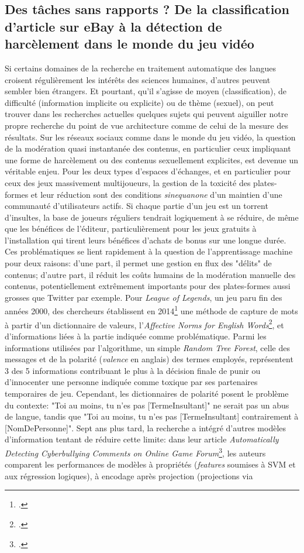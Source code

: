 \subsection{Des tâches sans rapports ? De la classification d'article sur eBay à la détection de harcèlement dans le monde du jeu vidéo}

Si certains domaines de la recherche en traitement automatique des langues croisent régulièrement les intérêts des sciences humaines, d'autres peuvent sembler bien étrangers. Et pourtant, qu'il s'agisse de moyen (classification), de difficulté (information implicite ou explicite) ou de thème (sexuel), on peut trouver dans les recherches actuelles quelques sujets qui peuvent aiguiller notre propre recherche du point de vue architecture comme de celui de la mesure des résultats. Sur les réseaux sociaux comme dans le monde du jeu vidéo, la question de la modération quasi instantanée des contenus, en particulier ceux impliquant une forme de harcèlement ou des contenus sexuellement explicites, est devenue un véritable enjeu. Pour les deux types d'espaces d'échanges, et en particulier pour ceux des jeux massivement multijoueurs, la gestion de la toxicité des plates-formes et leur réduction sont des conditions \textit{sinequanone} d'un maintien d'une communauté d'utilisateurs actifs. Si chaque partie d'un jeu est un torrent d'insultes, la base de joueurs réguliers tendrait logiquement à se réduire, de même que les bénéfices de l'éditeur, particulièrement pour les jeux gratuits à l'installation qui tirent leurs bénéfices d'achats de bonus sur une longue durée. Ces problématiques se lient rapidement à la question de l'apprentissage machine pour deux raisons: d'une part, il permet une gestion en flux des "délits" de contenus; d'autre part, il réduit les coûts humains de la modération manuelle des contenus, potentiellement extrêmement importants pour des plates-formes aussi grosses que Twitter par exemple. Pour \textit{League of Legends}, un jeu paru fin des années 2000, des chercheurs établissent en 2014\footcite{blackburn_stfu_2014} une méthode de capture de mots à partir d'un dictionnaire de valeurs, l'\textit{Affective Norms for English Words}\footcite{bradley_affective_1999}, et d'informations liées à la partie indiquée comme problématique. Parmi les informations utilisées par l'algorithme, un simple \textit{Random Tree Forest}, celle des messages et de la polarité (\textit{valence} en anglais) des termes employés, représentent 3 des 5 informations contribuant le plus à la décision finale de punir ou d'innocenter une personne indiquée comme toxique par ses partenaires temporaires de jeu. Cependant, les dictionnaires de polarité posent le problème du contexte: "Toi au moins, tu n'es pas [TermeInsultant]" ne serait pas un abus de langue, tandis que "Toi au moins, tu n'es pas [TermeInsultant] contrairement à [NomDePersonne]". Sept ans plus tard, la recherche a intégré d'autres modèles d'information tentant de réduire cette limite: dans leur article \textit{Automatically Detecting Cyberbullying Comments on Online Game Forum}\footcite{vo_automatically_2021}, les auteurs comparent les performances de modèles à propriétés (\textit{features} soumises à SVM et aux régression logiques), à encodage après projection (projections via 